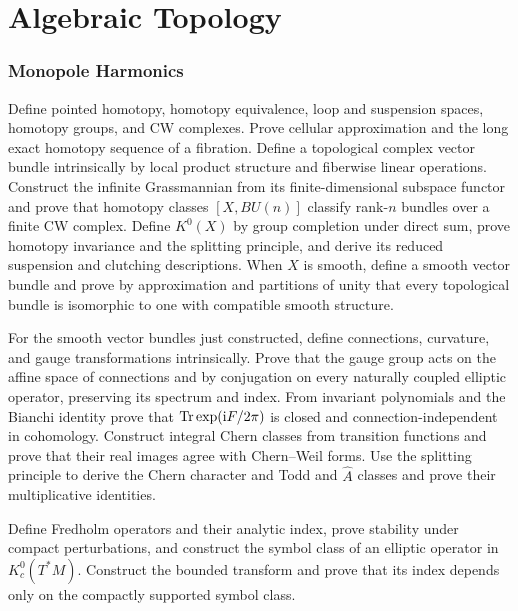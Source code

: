 \part{Algebraic Topology}

\section{Monopole Harmonics}

\begin{exercise}
Define pointed homotopy, homotopy equivalence, loop and suspension spaces,
homotopy groups, and CW complexes.  Prove cellular approximation and the long
exact homotopy sequence of a fibration.  Define a topological complex vector
bundle intrinsically by local product structure and fiberwise linear
operations.  Construct the infinite Grassmannian from its finite-dimensional
subspace functor and prove that homotopy classes $[X,BU(n)]$ classify rank-$n$
bundles over a finite CW complex.  Define $K^0(X)$ by group completion under
direct sum, prove homotopy invariance and the splitting principle, and derive
its reduced suspension and clutching descriptions.  When $X$ is smooth,
define a smooth vector bundle and prove by approximation and partitions of
unity that every topological bundle is isomorphic to one with compatible
smooth structure.
\end{exercise}

\begin{exercise}
For the smooth vector bundles just constructed, define connections, curvature,
and gauge transformations intrinsically.  Prove that the gauge group acts on
the affine space of connections and by conjugation on every naturally coupled
elliptic operator, preserving its spectrum and index.  From invariant
polynomials and the Bianchi
identity prove that $\operatorname{Tr}\exp(\mathrm i F/2\pi)$ is closed and connection-independent
in cohomology.  Construct integral Chern classes from transition functions
and prove that their real images agree with Chern--Weil forms.  Use the
splitting principle to derive the Chern character and Todd and $\widehat A$
classes and prove their multiplicative identities.
\end{exercise}

\begin{exercise}
Define Fredholm operators and their analytic index, prove stability under
compact perturbations, and construct the symbol class of an elliptic operator
in $K^0_c(T^*M)$.  Construct the bounded transform and prove that its index
depends only on the compactly supported symbol class.
\end{exercise}

